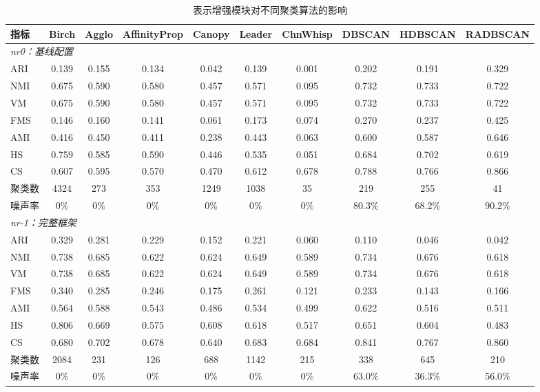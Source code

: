 \documentclass[10.5pt,compsoc,UTF8]{CjC}
\theoremstyle{mystyle}
\begin{document}
\begin{table}[!htb]
\centering
\footnotesize
\caption{\heiti 表示增强模块对不同聚类算法的影响}
\label{tab:algo_effect}
\vspace{1.5mm}
\begin{adjustbox}{width=\textwidth}
\begin{tabular}{lccccccccc}
\toprule
指标 & Birch & Agglo & AffinityProp & Canopy & Leader & ChnWhisp & DBSCAN & HDBSCAN & RADBSCAN \\
\midrule
\multicolumn{10}{l}{\emph{nr0：基线配置}} \\
ARI & 0.139 & 0.155 & 0.134 & 0.042 & 0.139 & 0.001 & 0.202 & 0.191 & 0.329 \\
NMI & 0.675 & 0.590 & 0.580 & 0.457 & 0.571 & 0.095 & 0.732 & 0.733 & 0.722 \\
VM & 0.675 & 0.590 & 0.580 & 0.457 & 0.571 & 0.095 & 0.732 & 0.733 & 0.722 \\
FMS & 0.146 & 0.160 & 0.141 & 0.061 & 0.173 & 0.074 & 0.270 & 0.237 & 0.425 \\
AMI & 0.416 & 0.450 & 0.411 & 0.238 & 0.443 & 0.063 & 0.600 & 0.587 & 0.646 \\
HS & 0.759 & 0.585 & 0.590 & 0.446 & 0.535 & 0.051 & 0.684 & 0.702 & 0.619 \\
CS & 0.607 & 0.595 & 0.570 & 0.470 & 0.612 & 0.678 & 0.788 & 0.766 & 0.866 \\
聚类数 & 4324 & 273 & 353 & 1249 & 1038 & 35 & 219 & 255 & 41 \\
噪声率 & 0\% & 0\% & 0\% & 0\% & 0\% & 0\% & 80.3\% & 68.2\% & 90.2\% \\
\midrule
\multicolumn{10}{l}{\emph{nr-1：完整框架}} \\
ARI & 0.329 & 0.281 & 0.229 & 0.152 & 0.221 & 0.060 & 0.110 & 0.046 & 0.042 \\
NMI & 0.738 & 0.685 & 0.622 & 0.624 & 0.649 & 0.589 & 0.734 & 0.676 & 0.618 \\
VM & 0.738 & 0.685 & 0.622 & 0.624 & 0.649 & 0.589 & 0.734 & 0.676 & 0.618 \\
FMS & 0.340 & 0.285 & 0.246 & 0.175 & 0.261 & 0.121 & 0.233 & 0.143 & 0.166 \\
AMI & 0.564 & 0.588 & 0.543 & 0.486 & 0.534 & 0.499 & 0.622 & 0.516 & 0.511 \\
HS & 0.806 & 0.669 & 0.575 & 0.608 & 0.618 & 0.517 & 0.651 & 0.604 & 0.483 \\
CS & 0.680 & 0.702 & 0.678 & 0.640 & 0.683 & 0.684 & 0.841 & 0.767 & 0.860 \\
聚类数 & 2084 & 231 & 126 & 688 & 1142 & 215 & 338 & 645 & 210 \\
噪声率 & 0\% & 0\% & 0\% & 0\% & 0\% & 0\% & 63.0\% & 36.3\% & 56.0\% \\
\bottomrule
\end{tabular}
\end{adjustbox}
\end{table}
\end{document}
